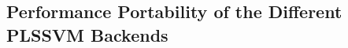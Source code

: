 \subsection{Performance Portability of the Different PLSSVM Backends}

\cite{own_plssvm_backends}
\cite{own_plssvm_software_impacts}
\cite{own_plssvm}